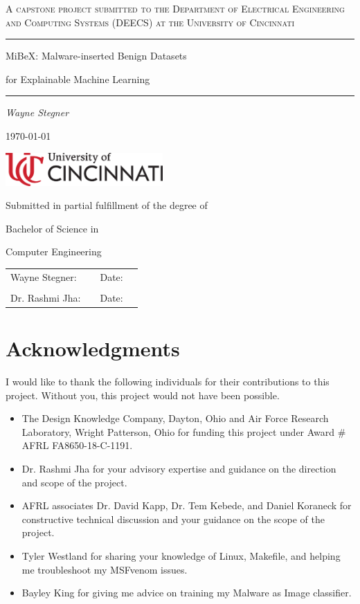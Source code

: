 \documentclass[12pt, letterpaper, titlepage]{article}
\newcommand{\msfv}{MSFvenom}
\newcommand{\mibex}{MiBeX}
\begin{document}
\begin{titlepage}
  \centering
  \par \normalsize \textsc{
    A capstone project submitted to the Department of Electrical Engineering
    and Computing Systems (DEECS) at the University of Cincinnati
  }
  \vfill
  \par \rule{\linewidth}{2pt}
  \LARGE
  \par \mibex{}: Malware-inserted Benign Datasets
  \par for Explainable Machine Learning
  \par \rule{\linewidth}{2pt}
  \vfill
  \Large
  \par \textit{Wayne Stegner}
  \vfill
  \normalsize
  \par \today
  \vfill
  \par \includegraphics[width=6cm]{Images/UC_Logo.eps}
  \vfill
  \normalsize
  \par Submitted in partial fulfillment of the degree of
  \par Bachelor of Science in
  \par Computer Engineering
  \vfill
  \begin{tabular}{p{3cm}p{6cm}p{1cm}p{3cm}}
    Wayne Stegner: & \hrulefill & Date: & \hrulefill\\
    \\
    Dr. Rashmi Jha: & \hrulefill & Date: & \hrulefill\\
  \end{tabular}
\end{titlepage}

\section*{Acknowledgments}
\par I would like to thank the following individuals for their contributions to this project.
Without you, this project would not have been possible.

\begin{itemize}
  \item The Design Knowledge Company, Dayton, Ohio and Air Force Research Laboratory, Wright Patterson, Ohio for funding this project under Award \# AFRL FA8650-18-C-1191.
  \item Dr. Rashmi Jha for your advisory expertise and guidance on the direction and scope of the project.
  \item AFRL associates Dr. David Kapp, Dr. Tem Kebede, and Daniel Koraneck for constructive technical discussion and your guidance on the scope of the project.
  \item Tyler Westland for sharing your knowledge of Linux, Makefile, and helping me troubleshoot my \msfv{} issues.
  \item Bayley King for giving me advice on training my Malware as Image classifier.
\end{itemize}
\end{document}
